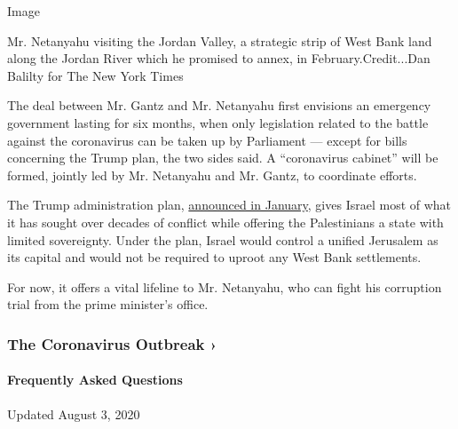 Image

Mr. Netanyahu visiting the Jordan Valley, a strategic strip of West Bank
land along the Jordan River which he promised to annex, in
February.Credit...Dan Balilty for The New York Times

The deal between Mr. Gantz and Mr. Netanyahu first envisions an
emergency government lasting for six months, when only legislation
related to the battle against the coronavirus can be taken up by
Parliament --- except for bills concerning the Trump plan, the two sides
said. A ``coronavirus cabinet'' will be formed, jointly led by Mr.
Netanyahu and Mr. Gantz, to coordinate efforts.

The Trump administration plan,
\href{https://www.nytimes.com/2020/01/28/world/middleeast/peace-plan.html}{announced
in January}, gives Israel most of what it has sought over decades of
conflict while offering the Palestinians a state with limited
sovereignty. Under the plan, Israel would control a unified Jerusalem as
its capital and would not be required to uproot any West Bank
settlements.

For now, it offers a vital lifeline to Mr. Netanyahu, who can fight his
corruption trial from the prime minister's office.

\href{https://www.nytimes.com/news-event/coronavirus?action=click\&pgtype=Article\&state=default\&region=MAIN_CONTENT_3\&context=storylines_faq}{}

\hypertarget{the-coronavirus-outbreak-}{%
\subsubsection{The Coronavirus Outbreak
›}\label{the-coronavirus-outbreak-}}

\hypertarget{frequently-asked-questions}{%
\paragraph{Frequently Asked
Questions}\label{frequently-asked-questions}}

Updated August 3, 2020


